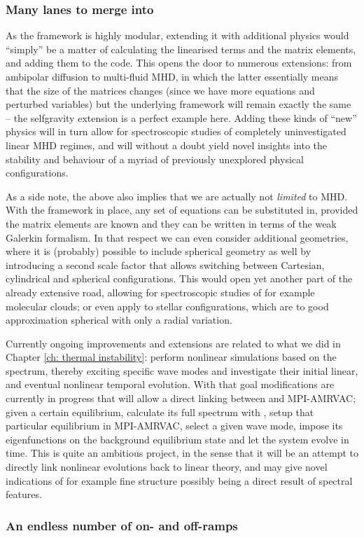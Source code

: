 \subsubsection{Many lanes to merge into}
As the {\legolas} framework is highly modular, extending it with additional physics would ``simply'' be a matter of calculating the linearised terms and the matrix elements, and adding them to the code. This opens the door to numerous extensions: from ambipolar diffusion to multi-fluid MHD, in which the latter essentially means that the size of the matrices changes (since we have more equations and perturbed variables) but the underlying framework will remain exactly the same -- the selfgravity extension is a perfect example here. Adding these kinds of ``new'' physics will in turn allow for spectroscopic studies of completely uninvestigated linear MHD regimes, and will without a doubt yield novel insights into the stability and behaviour of a myriad of previously unexplored physical configurations.

As a side note, the above also implies that we are actually not \emph{limited} to MHD. With the framework in place, any set of equations can be substituted in, provided the matrix elements are known and they can be written in terms of the weak Galerkin formalism. In that respect we can even consider additional geometries, where it is (probably) possible to include spherical geometry as well by introducing a second scale factor that allows switching between Cartesian, cylindrical and spherical configurations. This would open yet another part of the already extensive road, allowing for spectroscopic studies of for example molecular clouds; or even apply {\legolas} to stellar configurations, which are to good approximation spherical with only a radial variation.

Currently ongoing improvements and extensions are related to what we did in Chapter \ref{ch: thermal instability}: perform nonlinear simulations based on the spectrum, thereby exciting specific wave modes and investigate their initial linear, and eventual nonlinear temporal evolution. With that goal modifications are currently in progress that will allow a direct linking between {\legolas} and MPI-AMRVAC; given a certain equilibrium, calculate its full spectrum with {\legolas}, setup that particular equilibrium in MPI-AMRVAC, select a given wave mode, impose its eigenfunctions on the background equilibrium state and let the system evolve in time. This is quite an ambitious project, in the sense that it will be an attempt to directly link nonlinear evolutions back to linear theory, and may give novel indications of for example fine structure possibly being a direct result of spectral features.


\subsubsection{An endless number of on- and off-ramps}



\cleardoublepage
